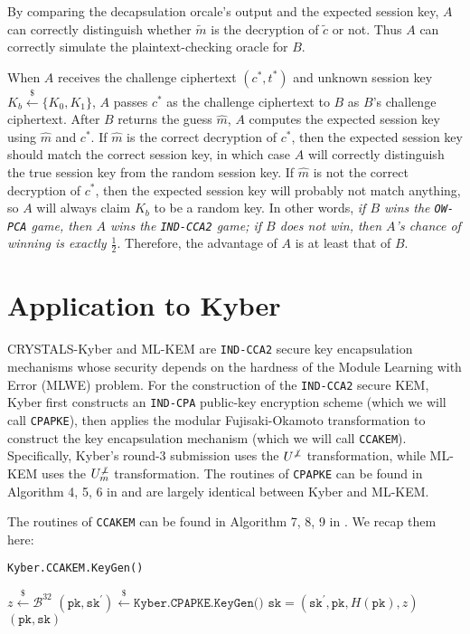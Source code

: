 \documentclass[floatrow,journal=tches,submission]{iacrtrans}
\newcommand{\monospace}{\texttt}
\newcommand{\pk}{\monospace{pk}}
\newcommand{\sk}{\monospace{sk}}
\newcommand{\leftsample}{\stackrel{\$}{\leftarrow}}
\begin{document}
By comparing the decapsulation orcale's output and the expected session key, $A$ can correctly distinguish whether $\tilde{m}$ is the decryption of $\tilde{c}$ or not. Thus $A$ can correctly simulate the plaintext-checking oracle for $B$.

When $A$ receives the challenge ciphertext $(c^\ast, t^\ast)$ and unknown session key $K_b \leftsample \{K_0, K_1\}$, $A$ passes $c^\ast$ as the challenge ciphertext to $B$ as $B$'s challenge ciphertext. After $B$ returns the guess $\hat{m}$, $A$ computes the expected session key using $\hat{m}$ and $c^\ast$. If $\hat{m}$ is the correct decryption of $c^\ast$, then the expected session key should match the correct session key, in which case $A$ will correctly distinguish the true session key from the random session key. If $\hat{m}$ is not the correct decryption of $c^\ast$, then the expected session key will probably not match anything, so $A$ will always claim $K_b$ to be a random key. In other words, \emph{if $B$ wins the \monospace{OW-PCA} game, then $A$ wins the \monospace{IND-CCA2} game; if $B$ does not win, then $A$'s chance of winning is exactly $\frac{1}{2}$}. Therefore, the advantage of $A$ is at least that of $B$.

\section{Application to Kyber}

CRYSTALS-Kyber \cite{bos2018crystals}\cite{avanzi2019crystals} and ML-KEM \cite{key2023mechanism} are \monospace{IND-CCA2} secure key encapsulation mechanisms whose security depends on the hardness of the Module Learning with Error (MLWE) problem. For the construction of the \monospace{IND-CCA2} secure KEM, Kyber first constructs an \monospace{IND-CPA} public-key encryption scheme (which we will call \monospace{CPAPKE}), then applies the modular Fujisaki-Okamoto transformation \cite{hofheinz2017modular} to construct the key encapsulation mechanism (which we will call \monospace{CCAKEM}). Specifically, Kyber's round-3 submission uses the $U^{\not\bot}$ transformation, while ML-KEM uses the $U^{\not\bot}_m$ transformation. The routines of \monospace{CPAPKE} can be found in Algorithm 4, 5, 6 in \cite{avanzi2019crystals} and are largely identical between Kyber and ML-KEM. 

The routines of \monospace{CCAKEM} can be found in Algorithm 7, 8, 9 in \cite{avanzi2019crystals}. We recap them here:

\begin{algorithm}[H]
    \caption{\monospace{Kyber.CCAKEM.KeyGen()}}
    \begin{algorithmic}[1]
        \State $z \leftsample \mathcal{B}^{32}$
        \State $(\pk, \sk^\prime) \leftsample \monospace{Kyber.CPAPKE.KeyGen()}$
        \State $\sk = (\sk^\prime, \pk, H(\pk), z)$
        \State \Return $(\pk, \sk)$
    \end{algorithmic}
\end{algorithm}
\end{document}

